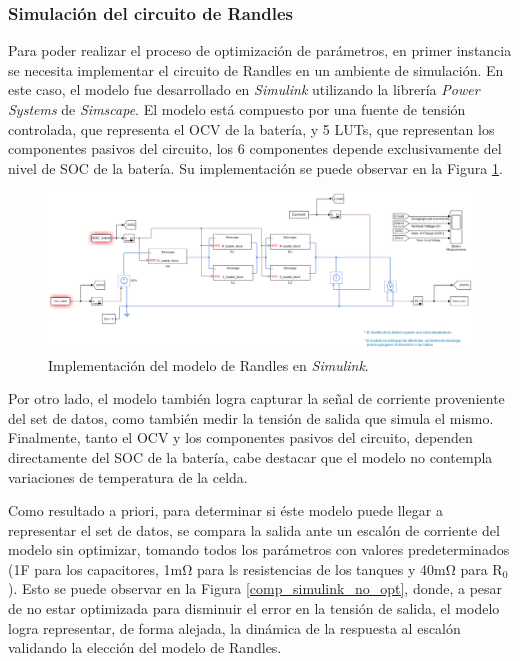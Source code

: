 \documentclass[10pt,a4paper]{article}
\begin{document}
\subsubsection{Simulaci\'on del circuito de Randles}

Para poder realizar el proceso de optimizaci\'on de par\'ametros, en primer 
instancia se necesita implementar el circuito de Randles en un ambiente de 
simulaci\'on. En este caso, el modelo fue desarrollado en \emph{Simulink}
utilizando la librer\'ia \emph{Power Systems} de \emph{Simscape}. El modelo
est\'a compuesto por una fuente de tensi\'on controlada, que representa el
\acrshort{OCV} de la bater\'ia, y 5 \acrshort{LUT}s, que representan los 
componentes pasivos del circuito, los 6 componentes depende exclusivamente del
nivel de \acrshort{SOC} de la bater\'ia. Su implementaci\'on se puede observar en la 
Figura \ref{battery_model_simulink}.

\begin{figure}[h!]
    \begin{center}
        \includegraphics[width=1\textwidth]{battery_model_simulink.png}
        \caption{Implementaci\'on del modelo de Randles en \emph{Simulink}.}
        \label{battery_model_simulink}
    \end{center}
\end{figure}

Por otro lado, el modelo tambi\'en logra capturar la señal de corriente 
proveniente del set de datos, como tambi\'en medir la tensi\'on de salida que 
simula el mismo. Finalmente, tanto el \acrshort{OCV} y los componentes pasivos 
del circuito, dependen directamente del \acrshort{SOC} de la bater\'ia, cabe
destacar que el modelo no contempla variaciones de temperatura de la celda.

Como resultado a priori, para determinar si \'este modelo puede llegar a
representar el set de datos, se compara la salida ante un escal\'on de corriente 
del modelo sin optimizar, tomando todos los par\'ametros con valores
predeterminados (1F para los capacitores, 1m$\mathrm{\Omega}$ para ls
resistencias de los tanques y 40m$\mathrm{\Omega}$ para $\mathrm{R_0}$). 
Esto se puede observar en la Figura \ref{comp_simulink_no_opt}, donde, a pesar
de no estar optimizada para disminuir el error en la tensi\'on de salida, el
modelo logra representar, de forma alejada, la din\'amica de la respuesta al 
escal\'on validando la elecci\'on del modelo de Randles.
\end{document}

